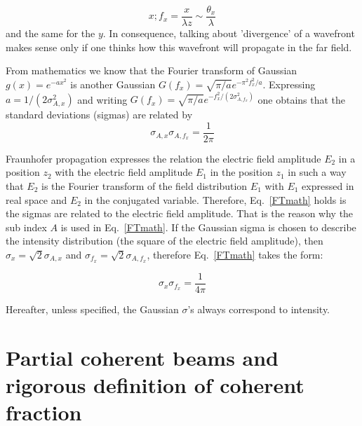 \documentclass{iucr}              %
\begin{document}
\begin{equation}
x ;  f_x = \frac{x}{\lambda z}  \sim \frac{ \theta_x }{ \lambda } 
\end{equation}
and the same for the $y$. In consequence, talking about 'divergence' of  a wavefront makes sense only if one thinks how this wavefront will propagate in the far field. 


From mathematics we know that the Fourier transform of  Gaussian $g(x) = e^{-ax^2}$ is another Gaussian $G(f_x) = \sqrt{\pi/a} e^{- \pi^2 f_x^2/a}$. Expressing $a=1/(2 \sigma_{A,x}^2)$ and writing $G(f_x) = \sqrt{\pi/a} e^{- f_x^2/(2 \sigma_{A,f_x}^2)}$ one obtains that the standard deviations (sigmas) are related by 
\begin{equation}
\label{FTmath}
\sigma_{A,x} \sigma_{A,f_x}= \frac{1}{2 \pi}
\end{equation}

Fraunhofer propagation expresses the relation the electric field amplitude $E_2$ in a position $z_2$ with the electric field amplitude $E_1$ in the position $z_1$ in such a way that $E_2$ is the Fourier transform of the field distribution $E_1$ with $E_1$ expressed in real space and $E_2$ in the conjugated variable. Therefore, Eq.~\ref{FTmath} holds is the sigmas are related to the electric field amplitude. That is the reason why the sub index $A$ is used in Eq.~\ref{FTmath}. If the Gaussian sigma is chosen to describe the intensity distribution (the square of the electric field amplitude), then $\sigma_x=\sqrt{2}\sigma_{A,x}$ and $\sigma_{f_x}=\sqrt{2}\sigma_{A,f_x}$, therefore Eq.~\ref{FTmath} takes the form: 

\begin{equation}
\sigma_{x} \sigma_{f_x}= \frac{1}{4 \pi}
\end{equation}

Hereafter, unless specified, the Gaussian $\sigma$'s always correspond to intensity. 

\section{Partial coherent beams and rigorous definition of coherent fraction}
\end{document}

